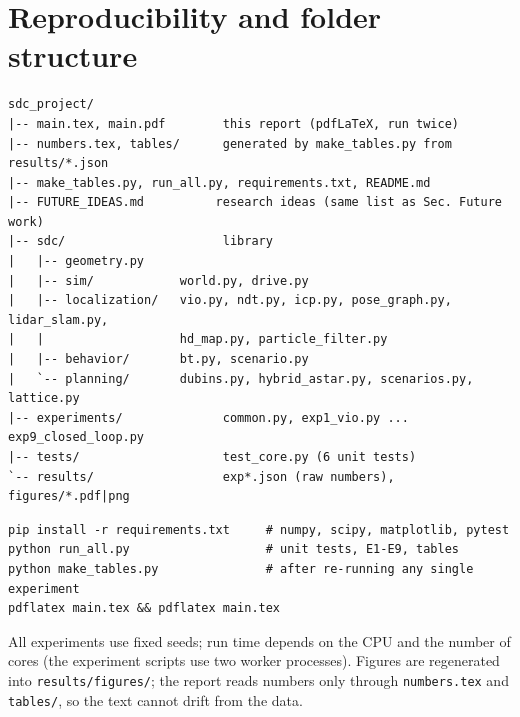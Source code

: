 \documentclass[11pt,a4paper]{article}
\begin{document}
\section{Reproducibility and folder structure}\label{sec:repro}
\noindent\begin{minipage}{\linewidth}\begin{lstlisting}[basicstyle=\ttfamily\footnotesize,frame=single]
sdc_project/
|-- main.tex, main.pdf        this report (pdfLaTeX, run twice)
|-- numbers.tex, tables/      generated by make_tables.py from results/*.json
|-- make_tables.py, run_all.py, requirements.txt, README.md
|-- FUTURE_IDEAS.md          research ideas (same list as Sec. Future work)
|-- sdc/                      library
|   |-- geometry.py
|   |-- sim/            world.py, drive.py
|   |-- localization/   vio.py, ndt.py, icp.py, pose_graph.py, lidar_slam.py,
|   |                   hd_map.py, particle_filter.py
|   |-- behavior/       bt.py, scenario.py
|   `-- planning/       dubins.py, hybrid_astar.py, scenarios.py, lattice.py
|-- experiments/              common.py, exp1_vio.py ... exp9_closed_loop.py
|-- tests/                    test_core.py (6 unit tests)
`-- results/                  exp*.json (raw numbers), figures/*.pdf|png
\end{lstlisting}\end{minipage}\par\smallskip
\begin{lstlisting}[basicstyle=\ttfamily\footnotesize,frame=single]
pip install -r requirements.txt     # numpy, scipy, matplotlib, pytest
python run_all.py                   # unit tests, E1-E9, tables
python make_tables.py               # after re-running any single experiment
pdflatex main.tex && pdflatex main.tex
\end{lstlisting}
All experiments use fixed seeds; run time depends on the CPU and the number of cores (the experiment scripts use two worker processes). Figures are regenerated into \texttt{results/figures/}; the report reads numbers only through \texttt{numbers.tex} and \texttt{tables/}, so the text cannot drift from the data.
\end{document}
